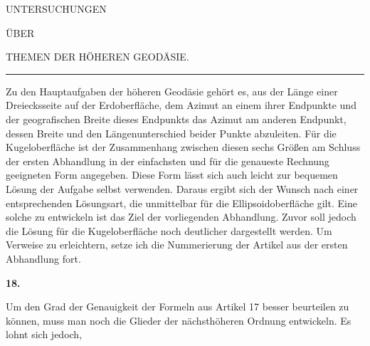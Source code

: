 \renewcommand{\Article}[1]{\par\medskip\Needspace{4\baselineskip}\pdfbookmark[1]{Art. #1}{geodaesie2-art-#1}\centerline{\textbf{#1.}}\nobreak\smallskip}
\begin{center}
UNTERSUCHUNGEN\par\bigskip
ÜBER\par\bigskip
{\large THEMEN DER HÖHEREN GEODÄSIE.}\par\medskip
\rule{.65in}{.3pt}
\end{center}
\noindent\hspace*{\parindent}Zu den Hauptaufgaben der höheren Geodäsie gehört es, aus der Länge einer Dreiecksseite auf der Erdoberfläche, dem Azimut an einem ihrer Endpunkte und der geografischen Breite dieses Endpunkts das Azimut am anderen Endpunkt, dessen Breite und den Längenunterschied beider Punkte abzuleiten. Für die Kugeloberfläche ist der Zusammenhang zwischen diesen sechs Größen am Schluss der ersten Abhandlung in der einfachsten und für die genaueste Rechnung geeigneten Form angegeben. Diese Form lässt sich auch leicht zur bequemen Lösung der Aufgabe selbst verwenden. Daraus ergibt sich der Wunsch nach einer entsprechenden Lösungsart, die unmittelbar für die Ellipsoidoberfläche gilt. Eine solche zu entwickeln ist das Ziel der vorliegenden Abhandlung. Zuvor soll jedoch die Lösung für die Kugeloberfläche noch deutlicher dargestellt werden. Um Verweise zu erleichtern, setze ich die Nummerierung der Artikel aus der ersten Abhandlung fort.

\Article{18}
Um den Grad der Genauigkeit der Formeln aus Artikel 17 besser beurteilen zu können, muss man noch die Glieder der nächsthöheren Ordnung entwickeln. Es lohnt sich jedoch,
